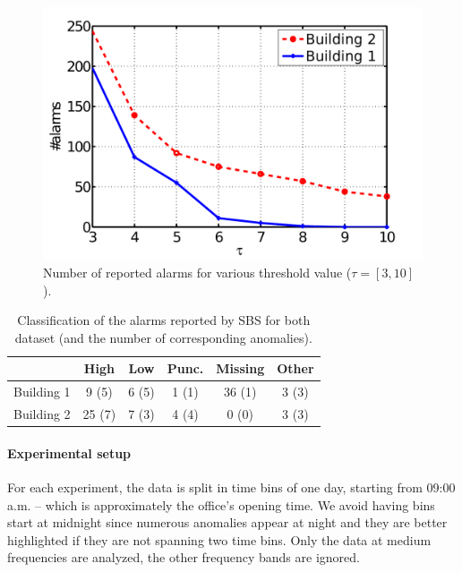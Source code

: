 
\begin{figure}
\begin{center}
 \includegraphics[width=.49\textwidth]{img/threshold-eps-converted-to.pdf}
 \caption{Number of reported alarms for various threshold value ($\tau=[3,10]$).}
 \label{fig:thres}
 \end{center}
\end{figure}

\begin{table}
\begin{center}
\begin{tabular}{|l||c|c|c|c|c|}
\hline
&High&Low&Punc.&Missing&Other\\ \hline \hline
Building 1& 9 (5) & 6 (5) & 1 (1) & 36 (1) & 3 (3) \\ \hline
Building 2& 25 (7) & 7 (3) & 4 (4) & 0 (0) & 3 (3) \\ \hline
\end{tabular}
\end{center}
\caption{Classification of the alarms reported by SBS for both dataset (and the number of corresponding anomalies).}
\label{tab:classif}
\end{table}

\paragraph{Experimental setup}
For each experiment, the data is split in time bins of one day, starting from 09:00 a.m. -- which is approximately 
the office's opening time.
We avoid having bins start at midnight since numerous anomalies appear at night and they are better highlighted if they are 
not spanning two time bins.
Only the data at medium frequencies are analyzed, the other frequency bands are ignored.



